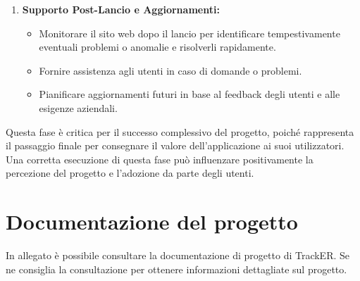 \documentclass[oneside]{book}
\begin{document}
\begin{enumerate}
    \item \textbf{Supporto Post-Lancio e Aggiornamenti:}
    \begin{itemize}
        \item Monitorare il sito web dopo il lancio per identificare tempestivamente eventuali problemi o anomalie e risolverli rapidamente.
        \item Fornire assistenza agli utenti in caso di domande o problemi.
          \item Pianificare aggiornamenti futuri in base al feedback degli utenti e alle esigenze aziendali.
    \end{itemize}
\end{enumerate}


Questa fase è critica per il successo complessivo del progetto, poiché rappresenta il passaggio finale per consegnare il valore dell'applicazione ai suoi utilizzatori. Una corretta esecuzione di questa fase può influenzare positivamente la percezione del progetto e l'adozione da parte degli utenti.

\section{Documentazione del progetto}
In allegato è possibile consultare la documentazione di progetto di TrackER. Se ne consiglia la consultazione per ottenere informazioni dettagliate sul progetto.
\end{document}
